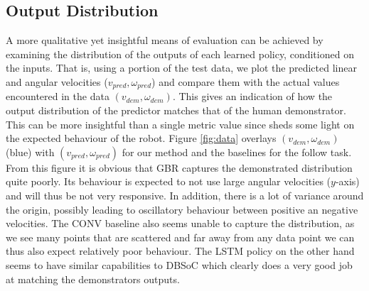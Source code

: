\documentclass[letterpaper, 10 pt, conference]{ieeeconf}
\begin{document}
\subsection{Output Distribution}
A more qualitative yet insightful means of evaluation can be achieved by examining the distribution of the outputs of each learned policy, conditioned on the inputs. That is, using a portion of the test data, we plot the predicted linear and angular velocities ($v_{pred},\omega_{pred}$) and compare them with the actual values encountered in the data $(v_{dem},\omega_{dem})$. This gives an indication of how the output distribution of the predictor matches that of the human demonstrator. This can be more insightful than a single metric value since sheds some light on the expected behaviour of the robot. Figure \ref{fig:data} overlays $(v_{dem},\omega_{dem})$ (blue) with $(v_{pred},\omega_{pred})$ for our method and the baselines for the follow task. From this figure it is obvious that GBR captures the demonstrated distribution quite poorly. Its behaviour is expected to not use large angular velocities ($y$-axis) and will thus be not very responsive. In addition, there is a lot of variance around the origin, possibly leading to oscillatory behaviour between positive an negative velocities. The CONV baseline also seems unable to capture the distribution, as we see many points that are scattered and far away from any data point we can thus also expect relatively poor behaviour. The LSTM policy on the other hand seems to have similar capabilities to DBSoC which clearly does a very good job at matching the demonstrators outputs. 
\end{document}
